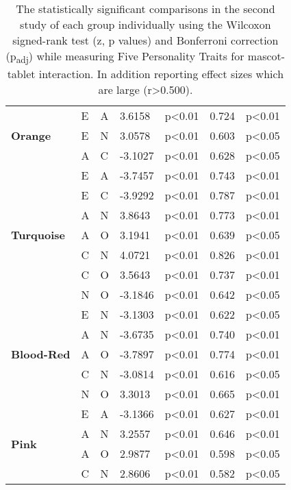 \begin{table}
\begin{center}
\begin{tabular}{ |p{2cm}| p{0.5cm}|p{0.5cm}|p{1.3cm}| p{2.1cm}|p{1cm}|p{1.7cm}|  }
            \hline
            \hline
            \multirow{3}{*}{\textbf{Orange}}
            &E &A &3.6158 &p<0.01 & 0.724 &p<0.01\\
            &E &N &3.0578 &p<0.01 &0.603 &p<0.05\\
            &A &C &-3.1027 &p<0.01 & 0.628 &p<0.05\\
            \hline
            \hline
            \multirow{7}{*}{\textbf{Turquoise}}
            &E &A &-3.7457 &p<0.01 &0.743 &p<0.01\\
            &E &C &-3.9292 &p<0.01 &0.787 &p<0.01\\
            &A &N &3.8643 &p<0.01 &0.773 &p<0.01\\
            &A &O &3.1941 &p<0.01 &0.639 &p<0.05\\
            &C &N &4.0721 &p<0.01 &0.826 &p<0.01\\
            &C &O &3.5643 &p<0.01 & 0.737 &p<0.01\\
            &N &O &-3.1846 &p<0.01 & 0.642 &p<0.05\\
            \hline
            \hline
            \multirow{5}{*}{\textbf{Blood-Red}}
            &E &N &-3.1303 &p<0.01 &0.622 &p<0.05\\
            &A &N &-3.6735 &p<0.01 &0.740 &p<0.01\\
            &A &O &-3.7897 &p<0.01 &0.774 &p<0.01\\
            &C &N &-3.0814 &p<0.01 &0.616 &p<0.05\\
            &N &O &3.3013 &p<0.01 &0.665 &p<0.01\\
            \hline
            \hline
            \multirow{4}{*}{\textbf{Pink}}
            &E &A &-3.1366 &p<0.01 &0.627 &p<0.01\\
            &A &N &3.2557 &p<0.01 &0.646 &p<0.01\\
            &A &O &2.9877 &p<0.01 &0.598 &p<0.05\\
            &C &N &2.8606 &p<0.01 & 0.582 &p<0.05\\
            \hline
        \end{tabular}
    \end{center}
    \captionsetup{width=13.5cm}
    \caption{The statistically significant comparisons in the second study of each group individually using the Wilcoxon
    signed-rank test (z, p values) and Bonferroni correction (p\textsubscript{adj}) while measuring Five Personality Traits for mascot-tablet interaction.
    In addition reporting effect sizes which are large (r>0.500).}
    \label{table:wilcoxMT2}
\end{table}

